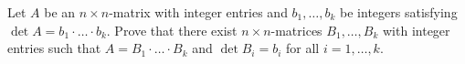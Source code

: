 \documentclass{article}
\begin{document}
\setlength{\parindent}{0pt}
Let $A$ be an $n\times n$-matrix with integer entries and $b_{1},\dots,b_{k}$ be integers satisfying $\det A=b_{1}\cdot {\dots}\cdot b_{k}$. Prove that there exist $n\times n$-matrices $B_{1},\dots,B_{k}$ with integer entries such that $A=B_{1}\cdot{\dots}\cdot B_{k}$ and $\det B_{i}=b_{i}$ for all $i=1,\dots,k$.
\end{document}
